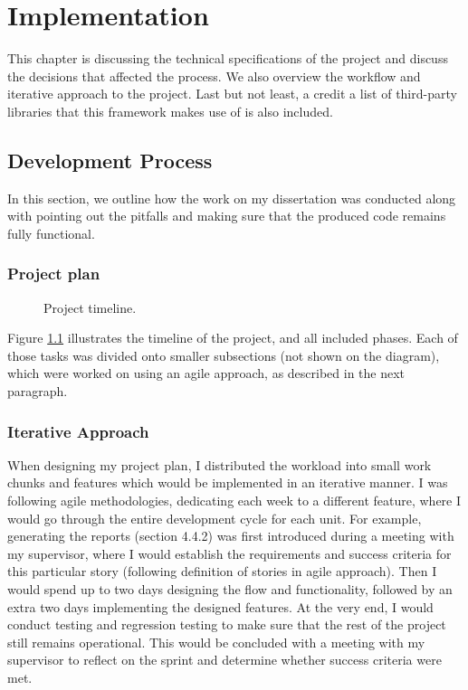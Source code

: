 \chapter{Implementation\label{chap:implementation}}
This chapter is discussing the technical specifications of the project and discuss the decisions that affected the process. We also overview the workflow and iterative approach to the project. Last but not least, a credit a list of third-party libraries that this framework makes use of is also included.

\section{Development Process}

In this section, we outline how the work on my dissertation was conducted along with pointing out the pitfalls and making sure that the produced code remains fully functional.

\subsection{Project plan}

\begin{figure}[h]
    \centering
    \caption{Project timeline.}
    \label{fig:timeline}
\end{figure}

Figure \ref{fig:timeline} illustrates the timeline of the project, and all included phases. Each of those tasks was divided onto smaller subsections (not shown on the diagram), which were worked on using an agile approach, as described in the next paragraph.

\subsection{Iterative Approach}

When designing my project plan, I distributed the workload into small work chunks and features which would be implemented in an iterative manner. I was following agile methodologies, dedicating each week to a different feature, where I would go through the entire development cycle for each unit. For example, generating the reports (section 4.4.2) was first introduced during a meeting with my supervisor, where I would establish the requirements and success criteria for this particular story (following definition of stories in agile approach). Then I would spend up to two days designing the flow and functionality, followed by an extra two days implementing the designed features. At the very end, I would conduct testing and regression testing to make sure that the rest of the project still remains operational. This would be concluded with a meeting with my supervisor to reflect on the sprint and determine whether success criteria were met.

